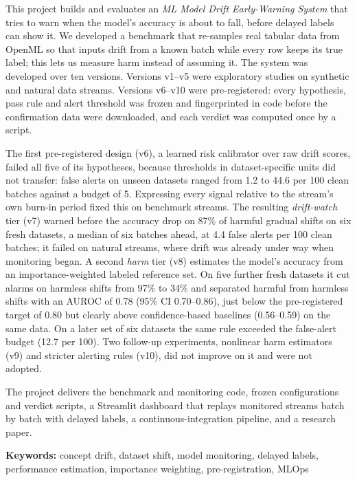 This project builds and evaluates an \emph{ML Model Drift Early-Warning System} that tries to warn when the model's accuracy is about to fall, before delayed labels can show it. We developed a benchmark that re-samples real tabular data from OpenML so that inputs drift from a known batch while every row keeps its true label; this lets us measure harm instead of assuming it. The system was developed over ten versions. Versions v1--v5 were exploratory studies on synthetic and natural data streams. Versions v6--v10 were pre-registered: every hypothesis, pass rule and alert threshold was frozen and fingerprinted in code before the confirmation data were downloaded, and each verdict was computed once by a script.

The first pre-registered design (v6), a learned risk calibrator over raw drift scores, failed all five of its hypotheses, because thresholds in dataset-specific units did not transfer: false alerts on unseen datasets ranged from 1.2 to 44.6 per 100 clean batches against a budget of 5. Expressing every signal relative to the stream's own burn-in period fixed this on benchmark streams. The resulting \emph{drift-watch} tier (v7) warned before the accuracy drop on 87\% of harmful gradual shifts on six fresh datasets, a median of six batches ahead, at 4.4 false alerts per 100 clean batches; it failed on natural streams, where drift was already under way when monitoring began. A second \emph{harm} tier (v8) estimates the model's accuracy from an importance-weighted labeled reference set. On five further fresh datasets it cut alarms on harmless shifts from 97\% to 34\% and separated harmful from harmless shifts with an AUROC of 0.78 (95\% CI 0.70--0.86), just below the pre-registered target of 0.80 but clearly above confidence-based baselines (0.56--0.59) on the same data. On a later set of six datasets the same rule exceeded the false-alert budget (12.7 per 100). Two follow-up experiments, nonlinear harm estimators (v9) and stricter alerting rules (v10), did not improve on it and were not adopted.

The project delivers the benchmark and monitoring code, frozen configurations and verdict scripts, a Streamlit dashboard that replays monitored streams batch by batch with delayed labels, a continuous-integration pipeline, and a research paper.

\vspace{0.5cm}
\noindent\textbf{Keywords:} concept drift, dataset shift, model monitoring, delayed labels, performance estimation, importance weighting, pre-registration, MLOps
